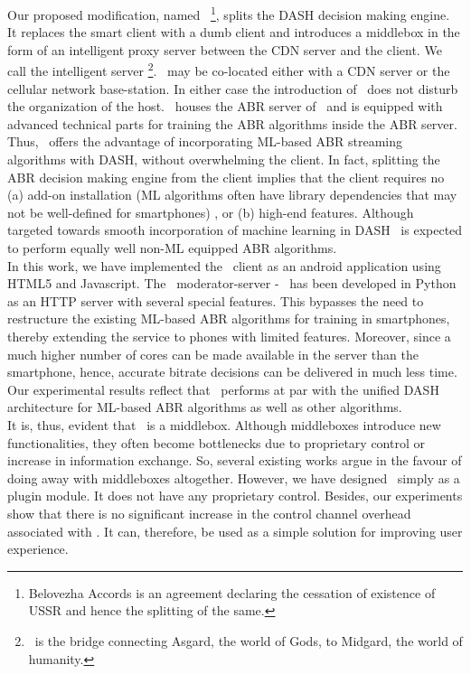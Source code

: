     \indent Our proposed modification, named \bel\ \footnote{Belovezha Accords is an agreement declaring the cessation of existence of USSR and hence the splitting of the same.}, splits the \ac{DASH} decision making engine. It replaces the smart client with a dumb client and introduces a middlebox in the form of an intelligent proxy server between the \ac{CDN} server and the client. We call the intelligent server \servname\footnote{\servname\ is the bridge connecting Asgard, the world of Gods, to Midgard, the world of humanity.}. \servname\ may be co-located either with a \ac{CDN} server  or the cellular network base-station. In either case the introduction of \servname\ does not disturb the organization of the host. \servname\ houses the \ac{ABR} server of~\cite{Mao2017,Akhtar2018,Sengupta2018} and is equipped with advanced technical parts for training the \ac{ABR} algorithms inside the \ac{ABR} server.  Thus, \bel\ offers the advantage of incorporating \ac{ML}-based \ac{ABR} streaming algorithms with DASH, without overwhelming the client. In fact, splitting the \ac{ABR} decision making engine from the client implies that the client requires no (a) add-on installation (\ac{ML} algorithms often have library dependencies that may not be well-defined for smartphones) , or (b) high-end features. Although targeted towards smooth incorporation of machine learning in \ac{DASH} \bel\ is expected to perform equally well non-\ac{ML} equipped \ac{ABR} algorithms.\\
    \indent In this work, we have implemented  the \bel\ client as an android application using HTML5 and Javascript. The \bel\ moderator-server - \servname\ has been developed in Python as an HTTP server with several special features. This bypasses the need to restructure the existing \ac{ML}-based ABR algorithms for training in smartphones, thereby extending the service to phones with limited features. Moreover, since a much higher number of cores can be made available in the server than the smartphone, hence, accurate bitrate decisions can be delivered in much less time. Our experimental results reflect that \bel\ performs at par with the unified \ac{DASH} architecture for ML-based ABR algorithms as well as other algorithms.  \\
    \indent It is, thus, evident that \servname\ is a middlebox. Although middleboxes introduce new functionalities, they often become bottlenecks due to proprietary control or increase in information exchange. So, several existing works \cite{Sherry2012} argue in the favour of doing away with middleboxes altogether. However, we have designed \servname\ simply as a plugin module. It does not have any proprietary control. Besides, our experiments show that there is no significant increase in the control channel overhead associated with \servname. It can, therefore, be used as a simple solution for improving user experience.

